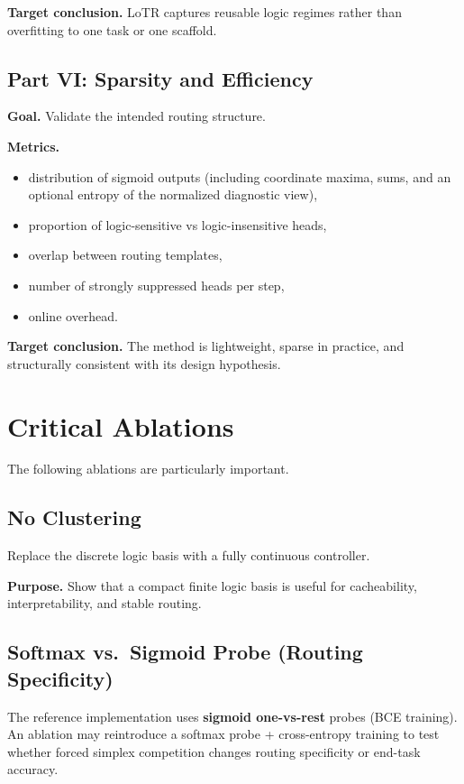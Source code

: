 \documentclass[11pt]{article}
\begin{document}
\textbf{Target conclusion.}
LoTR captures reusable logic regimes rather than overfitting to one task or one scaffold.

\subsection{Part VI: Sparsity and Efficiency}

\textbf{Goal.} Validate the intended routing structure.

\textbf{Metrics.}
\begin{itemize}[leftmargin=1.5em]
    \item distribution of sigmoid outputs (including coordinate maxima, sums, and an optional entropy of the normalized diagnostic view),
    \item proportion of logic-sensitive vs logic-insensitive heads,
    \item overlap between routing templates,
    \item number of strongly suppressed heads per step,
    \item online overhead.
\end{itemize}

\textbf{Target conclusion.}
The method is lightweight, sparse in practice, and structurally consistent with its design hypothesis.

\section{Critical Ablations}

The following ablations are particularly important.

\subsection{No Clustering}

Replace the discrete logic basis with a fully continuous controller.

\textbf{Purpose.} Show that a compact finite logic basis is useful for cacheability, interpretability, and stable routing.

\subsection{Softmax vs.\ Sigmoid Probe (Routing Specificity)}

The reference implementation uses \textbf{sigmoid one-vs-rest} probes (BCE training). An ablation may reintroduce a softmax probe + cross-entropy training to test whether forced simplex competition changes routing specificity or end-task accuracy.
\end{document}
